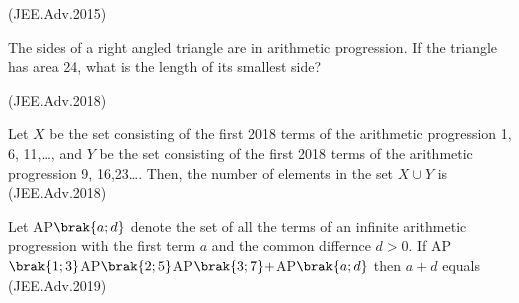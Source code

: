    \hfill(JEE.Adv.2015)

   \item The sides of a right angled triangle are in arithmetic progression. If the triangle has area 24, what is the length of its smallest side? 
   
   \hfill(JEE.Adv.2018)

   \item Let $X$ be the set consisting of the first 2018 terms of the arithmetic progression 1, 6, 11,\dots , and $Y$ be the set consisting of the first 2018 terms of the arithmetic progression 9, 16,23\dots . Then, the number of elements in the set $ X \cup Y $ is \hfill(JEE.Adv.2018)
   \item Let AP$\brak{a;d}$ denote the set of all the terms of an infinite arithmetic progression with the first term $a$ and the common differnce $d>0$. If AP$\brak{1;3}$AP$\brak{2;5}$AP$\brak{3;7}+$AP$\brak{a;d}$ then $a + d$ equals \hfill(JEE.Adv.2019)
   
    
